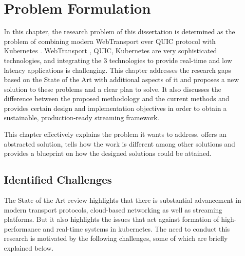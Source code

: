 \chapter{Problem Formulation}

In this chapter, the research problem of this dissertation is determined as the problem of combining modern WebTransport over QUIC protocol \cite{rfc9000} with Kubernetes \cite{kubernetes-docs}. WebTransport \cite{webtransport-draft}, QUIC, Kubernetes are very sophisticated technologies, and integrating the 3 technologies to provide real-time and low latency applications is challenging. This chapter addresses the research gaps based on the State of the Art with additional aspects of it and proposes a new solution to these problems and a clear plan to solve. It also discusses the difference between the proposed methodology and the current methods and provides certain design and implementation objectives in order to obtain a sustainable, production-ready streaming framework.

This chapter effectively explains the problem it wants to address, offers an abstracted solution, tells how the work is different among other solutions and provides a blueprint on how the designed solutions could be attained.

\section{Identified Challenges}
The State of the Art review highlights that there is substantial advancement in modern transport protocols, cloud-based networking as well as streaming platforms. But it also highlights the issues that act against formation of high-performance and real-time systems in kubernetes. The need to conduct this research is motivated by the following challenges, some of which are briefly explained below.

